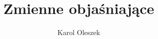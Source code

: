 \documentclass{article}
\begin{document}
\title{Zmienne objaśniające}
\author{Karol Oleszek}

\maketitle
\newpage
\tableofcontents

\newpage
\end{document}
